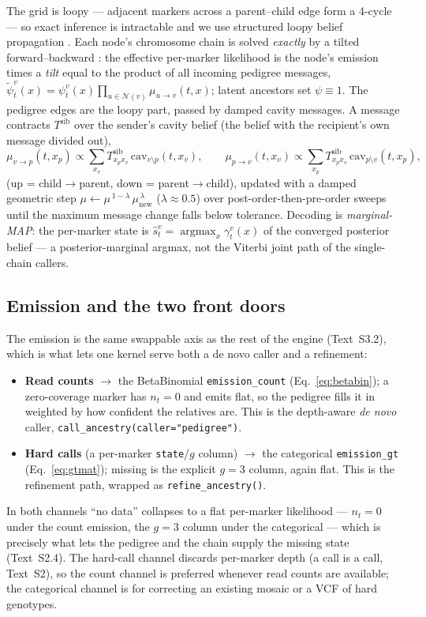\documentclass[11pt]{article}
\DeclareMathOperator*{\argmax}{argmax}
\begin{document}
The grid is loopy --- adjacent markers across a parent--child edge form a 4-cycle
--- so exact inference is intractable and we use structured loopy belief propagation
\citep{pearl_1988,kschischang_2001,yedidia_2005}. Each node's chromosome chain is
solved \emph{exactly} by a tilted forward--backward \citep{rabiner_1989}: the
effective per-marker likelihood is the node's emission times a \emph{tilt} equal to
the product of all incoming pedigree messages,
$\tilde\psi^v_t(x)=\psi^v_t(x)\prod_{u\in\mathcal N(v)}\mu_{u\to v}(t,x)$; latent
ancestors set $\psi\equiv1$. The pedigree edges are the loopy part, passed by damped
cavity messages. A message contracts $T^{\mathrm{sib}}$ over the sender's cavity
belief (the belief with the recipient's own message divided out),
\begin{equation}
\mu_{v\to p}(t,x_p)\propto\sum_{x_v} T^{\mathrm{sib}}_{x_p x_v}\,\mathrm{cav}_{v\setminus p}(t,x_v),
\qquad
\mu_{p\to v}(t,x_v)\propto\sum_{x_p} T^{\mathrm{sib}}_{x_p x_v}\,\mathrm{cav}_{p\setminus v}(t,x_p),
\label{eq:messages}
\end{equation}
(up = child$\to$parent, down = parent$\to$child), updated with a damped geometric
step $\mu\leftarrow\mu^{\,1-\lambda}\,\mu_{\mathrm{new}}^{\,\lambda}$ ($\lambda\approx0.5$)
over post-order-then-pre-order sweeps until the maximum message change falls below
tolerance. Decoding is \emph{marginal-MAP}: the per-marker state is
$\hat s^v_t=\argmax_x \gamma^v_t(x)$ of the converged posterior belief --- a
posterior-marginal argmax, not the Viterbi joint path of the single-chain callers.

\subsection{Emission and the two front doors}
\label{sec:ped-emission}

The emission is the same swappable axis as the rest of the engine (Text~S3.2),
which is what lets one kernel serve both a de novo caller and a refinement:
\begin{itemize}
\item \textbf{Read counts} $\to$ the BetaBinomial \texttt{emission\_count}
(Eq.~\eqref{eq:betabin}); a zero-coverage marker has $n_t=0$ and emits flat, so the
pedigree fills it in weighted by how confident the relatives are. This is the
depth-aware \emph{de novo} caller, \texttt{call\_ancestry(caller="pedigree")}.
\item \textbf{Hard calls} (a per-marker \texttt{state}/$g$ column) $\to$ the
categorical \texttt{emission\_gt} (Eq.~\eqref{eq:gtmat}); missing is the explicit
$g=3$ column, again flat. This is the refinement path, wrapped as
\texttt{refine\_ancestry()}.
\end{itemize}
In both channels ``no data'' collapses to a flat per-marker likelihood --- $n_t=0$
under the count emission, the $g=3$ column under the categorical --- which is
precisely what lets the pedigree and the chain supply the missing state (Text~S2.4).
The hard-call channel discards per-marker depth (a call is a call, Text~S2), so the
count channel is preferred whenever read counts are available; the categorical
channel is for correcting an existing mosaic or a VCF of hard genotypes.
\end{document}

